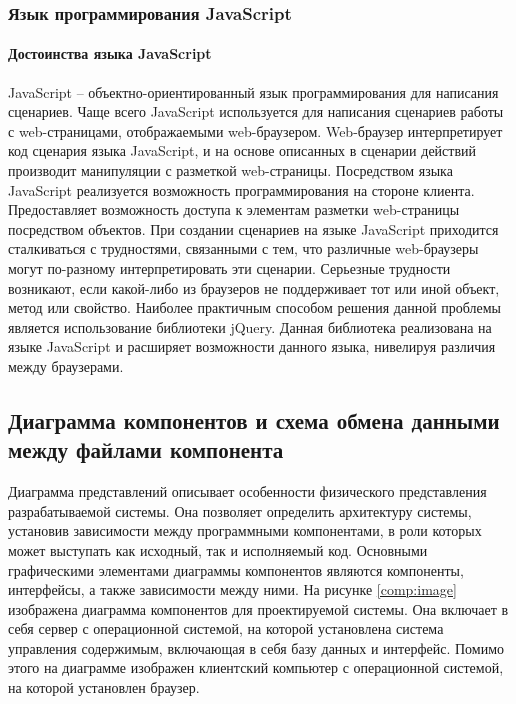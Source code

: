 \subsubsection{Язык программирования JavaScript}

\paragraph{Достоинства языка JavaScript}

JavaScript – объектно-ориентированный язык программирования для написания сценариев. Чаще всего JavaScript используется для написания сценариев работы с web-страницами, отображаемыми web-браузером. Web-бра\-у\-зер интерпретирует код сценария языка JavaScript, и на основе описанных в сценарии действий производит манипуляции с разметкой web-страницы. Посредством языка JavaScript реализуется возможность программирования на стороне клиента. Предоставляет возможность доступа к элементам разметки web-страницы посредством объектов. При создании сценариев на языке JavaScript приходится сталкиваться с трудностями, связанными с тем, что различные web-браузеры могут по-разному интерпретировать эти сценарии. Серьезные трудности возникают, если какой-либо из браузеров не поддерживает тот или иной объект, метод или свойство. Наиболее практичным способом решения данной проблемы является использование библиотеки jQuery. Данная библиотека реализована на языке JavaScript и расширяет возможности данного языка, нивелируя различия между браузерами.


\subsection{Диаграмма компонентов и схема обмена данными между файлами компонента}

Диаграмма представлений описывает особенности физического представления разрабатываемой системы. Она позволяет определить архитектуру системы, установив зависимости между программными компонентами, в роли которых может выступать как исходный, так и исполняемый код. Основными графическими элементами диаграммы компонентов являются компоненты, интерфейсы, а также зависимости между ними. На рисунке \ref{comp:image} изображена диаграмма компонентов для проектируемой системы. Она включает в себя сервер с операционной системой, на которой установлена система управления содержимым, включающая в себя базу данных и интерфейс. Помимо этого на диаграмме изображен клиентский компьютер с операционной системой, на которой установлен браузер.

